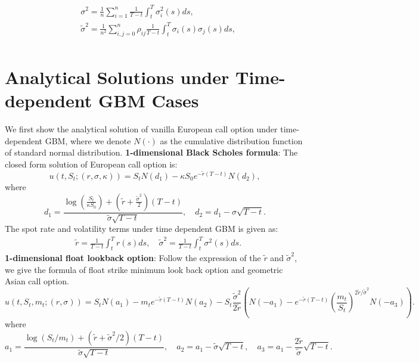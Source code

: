 \documentclass[11pt,a4paper]{article}
\theoremstyle{remark}
\begin{document}
	\begin{align}
		&\sigma^2 =\frac{1}{n} \sum_{i=1}^n \frac{1}{T-t}\int_t^T\sigma_i^2(s) ds , \\ 
		&\tilde{\sigma}^2 =\frac{1}{n^2} \sum_{i, j=0}^n \rho_{i j} \frac{1}{T-t}\int_t^T\sigma_i(s)\sigma_j(s) ds  , \\
	\end{align}
	
	
	\fi
	
	
	\section{Analytical Solutions under Time-dependent GBM Cases} \label{appendix}
	We first show the analytical solution of vanilla European call option under time-dependent GBM, where we denote $N(\cdot)$ as the cumulative distribution function of standard normal distribution.
	\noindent \textbf{1-dimensional Black Scholes formula}: The closed form solution of European call option is:
	\begin{equation*}
		u\left(t, S_t; (r, \sigma, \kappa)\right)=S_t N\left( d_1\right) -  \kappa S_0 e^{-\tilde{r}(T - t)}N\left( d_2\right),
	\end{equation*}
	where 
	\begin{equation*}
		d_1 = \frac{\log\left(\frac{S_t}{ \kappa S_0}\right)+\left(\tilde{r} + \frac{\tilde{\sigma}^2}{2}\right)(T-t)}{\tilde{\sigma}\sqrt{T-t}}, \quad d_2 = d_1 - \sigma\sqrt{T-t}.
	\end{equation*}
	The spot rate and volatility terms under time dependent GBM is given as:
	\begin{align}
		& \tilde{r} = \frac{1}{T-t}\int_t^T r(s) ds   , \quad \tilde{\sigma}^2 = \frac{1}{T-t}\int_t^T\sigma^2(s) ds.
	\end{align}
	\noindent \textbf{1-dimensional float lookback option}: Follow the expression of the $\tilde{r}$ and $\tilde{\sigma}^2$, we give the formula of float strike minimum look back option and geometric Asian call option.
	\begin{equation*}
		u(t, S_t, m_t; (r, \sigma))=S_t N\left(a_1\right)-m_t e^{-\tilde{r}(T-t)} N\left(a_2\right)-S_t \frac{\tilde{\sigma}^2}{2 \tilde{r}}\left(N\left(-a_1\right)-e^{-\tilde{r}(T-t)}\left(\frac{m_t}{S_t}\right)^{2 \tilde{r} / \tilde{\sigma}^2} N\left(-a_3\right)\right).
	\end{equation*}
	where
	\begin{equation*}
		a_1=\frac{\log \left(S_t / m_t\right)+\left(\tilde{r}+\tilde{\sigma}^2 / 2\right)(T-t)}{\tilde{\sigma} \sqrt{T-t}}, \quad a_2=a_1-\tilde{\sigma} \sqrt{T-t}, \quad a_3=a_1-\frac{2 \tilde{r}}{\tilde{\sigma}} \sqrt{T-t}.
	\end{equation*}
\end{document}
